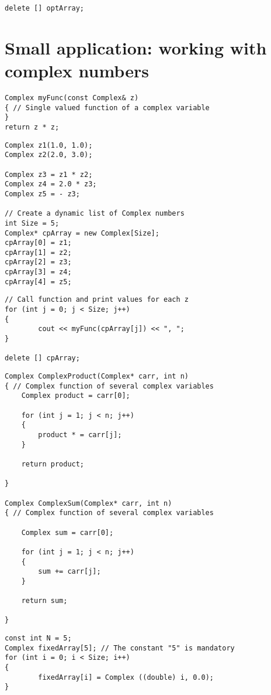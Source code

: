 \begin{lstlisting}
delete [] optArray;
\end{lstlisting}

\section{Small application: working with complex numbers}

\begin{lstlisting}
Complex myFunc(const Complex& z)
{ // Single valued function of a complex variable
}
return z * z;
\end{lstlisting}

\begin{lstlisting}
Complex z1(1.0, 1.0);
Complex z2(2.0, 3.0);

Complex z3 = z1 * z2;
Complex z4 = 2.0 * z3;
Complex z5 = - z3;

// Create a dynamic list of Complex numbers
int Size = 5;
Complex* cpArray = new Complex[Size];
cpArray[0] = z1;
cpArray[1] = z2;
cpArray[2] = z3;
cpArray[3] = z4;
cpArray[4] = z5;
\end{lstlisting}

\begin{lstlisting}
// Call function and print values for each z
for (int j = 0; j < Size; j++)
{
		cout << myFunc(cpArray[j]) << ", ";
}

delete [] cpArray;
\end{lstlisting}

\begin{lstlisting}
Complex ComplexProduct(Complex* carr, int n)
{ // Complex function of several complex variables
	Complex product = carr[0];

	for (int j = 1; j < n; j++)
	{
		product * = carr[j];
	}

	return product;

}

Complex ComplexSum(Complex* carr, int n)
{ // Complex function of several complex variables

	Complex sum = carr[0];

	for (int j = 1; j < n; j++)
	{
		sum += carr[j];
	}

	return sum;

}
\end{lstlisting}

\begin{lstlisting}
const int N = 5;
Complex fixedArray[5]; // The constant "5" is mandatory
for (int i = 0; i < Size; i++)
{
		fixedArray[i] = Complex ((double) i, 0.0);
}
\end{lstlisting}

